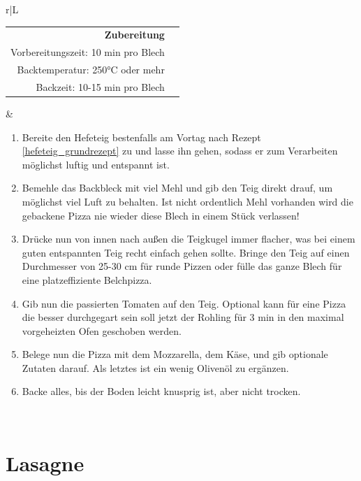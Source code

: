 \documentclass[a4paper, 12pt]{scrbook} 								%
\numberwithin{equation}{section} 									%
\begin{document}
				\newpage
				\begin{tabularx}{\textwidth}{r|L}
			
			
				\begin{tabular}[t]{rr}
					\textbf{Zubereitung}	\\
					Vorbereitungszeit: 10 min pro Blech	\\
					Backtemperatur: 250°C oder mehr		\\
					Backzeit: 10-15 min pro Blech \\  
				\end{tabular}			&	\begin{enumerate}[]
												\item Bereite den Hefeteig bestenfalls am Vortag nach Rezept \ref{hefeteig_grundrezept} zu und lasse ihn gehen, sodass er zum Verarbeiten möglichst luftig und entspannt ist.
												\item Bemehle das Backbleck mit viel Mehl und gib den Teig direkt drauf, um möglichst viel Luft zu behalten. Ist nicht ordentlich Mehl vorhanden wird die gebackene Pizza nie wieder diese Blech in einem Stück verlassen!
												\item Drücke nun von innen nach außen die Teigkugel immer flacher, was bei einem guten entspannten Teig recht einfach gehen sollte. Bringe den Teig auf einen Durchmesser von 25-30 cm für runde Pizzen oder fülle das ganze Blech für eine platzeffiziente Belchpizza.
												\item Gib nun die passierten Tomaten auf den Teig. Optional kann für eine Pizza die besser durchgegart sein soll jetzt der Rohling für 3 min in den maximal vorgeheizten Ofen geschoben werden.
												\item Belege nun die Pizza mit dem Mozzarella, dem Käse, und gib optionale Zutaten darauf. Als letztes ist ein wenig Olivenöl zu ergänzen.
												\item Backe alles, bis der Boden leicht knusprig ist, aber nicht trocken.
											\end{enumerate}	\\
			\end{tabularx}
			\newpage


			\section{Lasagne}	\label{lasagne}
\end{document}
